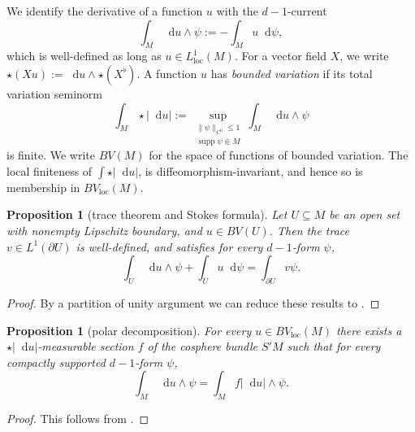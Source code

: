 \documentclass[final,12pt, leqno]{brownthesis}
\DeclareMathOperator{\supp}{supp}
\newcommand*\dif{\mathop{}\!\mathrm{d}}
\newcommand{\vol}{\mathrm{vol}}
\newcommand{\dfn}[1]{\emph{#1}\index{#1}}
\newcommand{\loc}{\mathrm{loc}}
\newtheorem{proposition}[theorem]{Proposition}
\theoremstyle{definition}
\numberwithin{equation}{section}
\begin{document}
We identify the derivative of a function $u$ with the $d-1$-current
$$\int_M \dif u \wedge \psi := -\int_M u \dif \psi,$$
which is well-defined as long as $u \in L^1_\loc(M)$.
For a vector field $X$, we write $\star (Xu) := \dif u \wedge \star (X^\flat)$.
A function $u$ has \dfn{bounded variation} if its total variation seminorm
\begin{equation}\label{total variation}
\int_M \star |\dif u| := \sup_{\substack{\|\psi\|_{C^0} \leq 1\\\supp \psi \Subset M}} \int_M \dif u \wedge \psi
\end{equation}
is finite. We write $BV(M)$ for the space of functions of bounded variation.
The local finiteness of $\int \star |\dif u|$, is diffeomorphism-invariant, and hence so is membership in $BV_\loc(M)$.

\begin{proposition}[trace theorem and Stokes formula]
Let $U \subseteq M$ be an open set with nonempty Lipschitz boundary, and $u \in BV(U)$.
Then the trace $v \in L^1(\partial U)$ is well-defined,
and satisfies for every $d - 1$-form $\psi$,
\begin{equation}\label{Miranda IBP}
\int_U \dif u \wedge \psi + \int_U u \dif \psi = \int_{\partial U} v\psi.
\end{equation}
\end{proposition}
\begin{proof}
By a partition of unity argument we can reduce these results to \cite[Teorema 1]{Miranda67}.
\end{proof}

\begin{proposition}[polar decomposition]
For every $u \in BV_\loc(M)$ there exists a $\star |\dif u|$-measurable section $f$ of the cosphere bundle $S'M$ such that for every compactly supported $d-1$-form $\psi$,
\begin{equation}\label{RNy formula}
\int_M \dif u \wedge \psi = \int_M f|\dif u| \wedge \psi.
\end{equation}
\end{proposition}
\begin{proof}
This follows from \cite[Theorem 4.14]{simon1983GMT}.
\end{proof}
\end{document}
